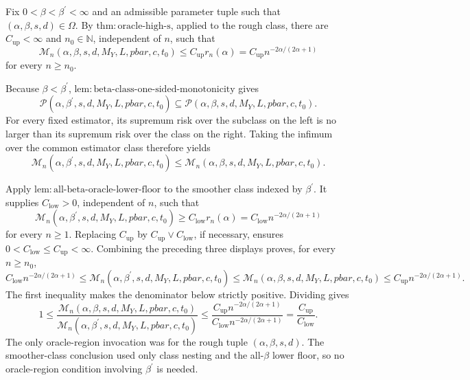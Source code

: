 Fix \(0<\beta<\beta^{\prime}<\infty\) and an admissible parameter tuple such that \((\alpha,\beta,s,d)\in\Omega\). By \(\mathrm{thm:oracle\text{-}high\text{-}s}\), applied to the rough class, there are \(C_{\mathrm{up}}<\infty\) and \(n_0\in\mathbb N\), independent of \(n\), such that
\[
\mathcal M_n(\alpha,\beta,s,d,M_Y,L,pbar,c,t_0)
\le C_{\mathrm{up}}r_n(\alpha)
=C_{\mathrm{up}}n^{-2\alpha/(2\alpha+1)}
\]
for every \(n\ge n_0\).

Because \(\beta<\beta^{\prime}\), \(\mathrm{lem:beta\text{-}class\text{-}one\text{-}sided\text{-}monotonicity}\) gives
\[
\mathcal P(\alpha,\beta^{\prime},s,d,M_Y,L,pbar,c,t_0)
\subseteq
\mathcal P(\alpha,\beta,s,d,M_Y,L,pbar,c,t_0).
\]
For every fixed estimator, its supremum risk over the subclass on the left is no larger than its supremum risk over the class on the right. Taking the infimum over the common estimator class therefore yields
\[
\mathcal M_n(\alpha,\beta^{\prime},s,d,M_Y,L,pbar,c,t_0)
\le
\mathcal M_n(\alpha,\beta,s,d,M_Y,L,pbar,c,t_0).
\]

Apply \(\mathrm{lem:all\text{-}beta\text{-}oracle\text{-}lower\text{-}floor}\) to the smoother class indexed by \(\beta^{\prime}\). It supplies \(C_{\mathrm{low}}>0\), independent of \(n\), such that
\[
\mathcal M_n(\alpha,\beta^{\prime},s,d,M_Y,L,pbar,c,t_0)
\ge C_{\mathrm{low}}r_n(\alpha)
=C_{\mathrm{low}}n^{-2\alpha/(2\alpha+1)}
\]
for every \(n\ge1\). Replacing \(C_{\mathrm{up}}\) by \(C_{\mathrm{up}}\vee C_{\mathrm{low}}\), if necessary, ensures \(0<C_{\mathrm{low}}\le C_{\mathrm{up}}<\infty\). Combining the preceding three displays proves, for every \(n\ge n_0\),
\[
C_{\mathrm{low}}n^{-2\alpha/(2\alpha+1)}
\le \mathcal M_n(\alpha,\beta^{\prime},s,d,M_Y,L,pbar,c,t_0)
\le \mathcal M_n(\alpha,\beta,s,d,M_Y,L,pbar,c,t_0)
\le C_{\mathrm{up}}n^{-2\alpha/(2\alpha+1)}.
\]
The first inequality makes the denominator below strictly positive. Dividing gives
\[
1\le
\frac{\mathcal M_n(\alpha,\beta,s,d,M_Y,L,pbar,c,t_0)}
{\mathcal M_n(\alpha,\beta^{\prime},s,d,M_Y,L,pbar,c,t_0)}
\le
\frac{C_{\mathrm{up}}n^{-2\alpha/(2\alpha+1)}}
{C_{\mathrm{low}}n^{-2\alpha/(2\alpha+1)}}
=\frac{C_{\mathrm{up}}}{C_{\mathrm{low}}}.
\]
The only oracle-region invocation was for the rough tuple \((\alpha,\beta,s,d)\). The smoother-class conclusion used only class nesting and the all-\(\beta\) lower floor, so no oracle-region condition involving \(\beta^{\prime}\) is needed.